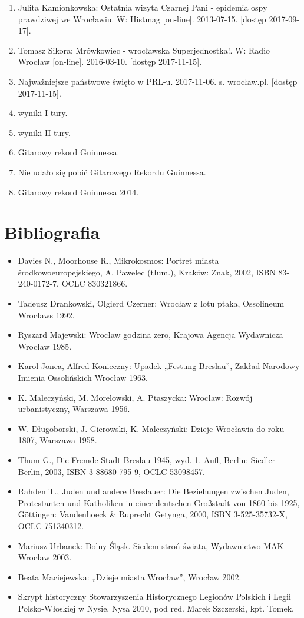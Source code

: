 \documentclass{article}
\begin{document}
\begin{enumerate}
\item Julita Kamionkowska: Ostatnia wizyta Czarnej Pani - epidemia ospy prawdziwej we Wrocławiu. W: Histmag [on-line]. 2013-07-15. [dostęp 2017-09-17].\label{26}
\item Tomasz Sikora: Mrówkowiec - wrocławska Superjednostka!. W: Radio Wrocław [on-line]. 2016-03-10. [dostęp 2017-11-15].\label{27}
\item  Najważniejsze państwowe święto w PRL-u. 2017-11-06. s. wrocław.pl. [dostęp 2017-11-15].\label{28}
\item  wyniki I tury.\label{29}
\item  wyniki II tury.\label{30}
\item Gitarowy rekord Guinnessa.\label{31}
\item  Nie udało się pobić Gitarowego Rekordu Guinnessa.\label{32}
\item  Gitarowy rekord Guinnessa 2014.\label{33}
 \end{enumerate}
 
\section{Bibliografia}

\begin{itemize}
\item Davies N., Moorhouse R., Mikrokosmos: Portret miasta środkowoeuropejskiego, A. Pawelec (tłum.), Kraków: Znak, 2002, ISBN 83-240-0172-7, OCLC 830321866.
\item Tadeusz Drankowski, Olgierd Czerner: Wrocław z lotu ptaka, Ossolineum Wrocławs 1992.
\item Ryszard Majewski: Wrocław godzina zero, Krajowa Agencja Wydawnicza Wrocław 1985.
\item Karol Jonca, Alfred Konieczny: Upadek „Festung Breslau”, Zakład Narodowy Imienia Ossolińskich Wrocław 1963.
\item K. Maleczyński, M. Morelowski, A. Ptaszycka: Wrocław: Rozwój urbanistyczny, Warszawa 1956.
\item W. Długoborski, J. Gierowski, K. Maleczyński: Dzieje Wrocławia do roku 1807, Warszawa 1958.
\item Thum G., Die Fremde Stadt Breslau 1945, wyd. 1. Aufl, Berlin: Siedler Berlin, 2003, ISBN 3-88680-795-9, OCLC 53098457.
\item Rahden T., Juden und andere Breslauer: Die Beziehungen zwischen Juden, Protestanten und Katholiken in einer deutschen Großstadt von 1860 bis 1925, Göttingen: Vandenhoeck \& Ruprecht Getynga, 2000, ISBN 3-525-35732-X, OCLC 751340312.
\item Mariusz Urbanek: Dolny Śląsk. Siedem stroń świata, Wydawnictwo MAK Wrocław 2003.
\item Beata Maciejewska: „Dzieje miasta Wrocław”, Wrocław 2002.
\item Skrypt historyczny Stowarzyszenia Historycznego Legionów Polskich i Legii Polsko-Włoskiej w Nysie, Nysa 2010, pod red. Marek Szczerski, kpt. Tomek.
\end{itemize}
\end{document}
